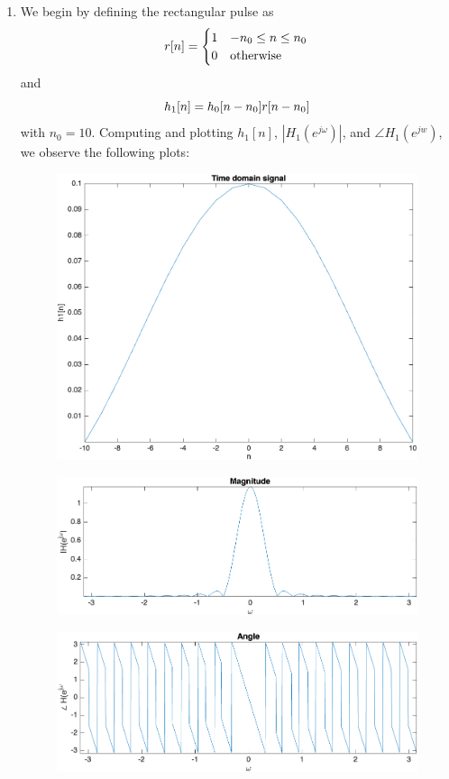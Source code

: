 \documentclass[12pt]{article}
\begin{document}
\begin{enumerate}[label=\textbf{\alph*)}, leftmargin=2.6em]
\item We begin by defining the rectangular pulse as
\begin{equation} \notag
    r[n]=
    \begin{cases}
        1 & -n_0\le n \le n_0\\
        0 & \text{otherwise}
    \end{cases}
\end{equation}
and
\begin{equation} \notag
    h_1[n]=h_0[n-n_0]r[n-n_0]
\end{equation}
with $n_0=10$. Computing and plotting $h_1[n]$, $|H_1(e^{j\omega})|$, and $\angle H_1(e^{jw})$, we observe the following plots:
\begin{figure} [H]
    \centering
    \includegraphics[width=0.75\linewidth]{1.png}
\end{figure}
\begin{figure} [H]
    \centering
    \includegraphics[width=0.75\linewidth]{2.png}
\end{figure}
\begin{figure} [H]
    \centering
    \includegraphics[width=0.75\linewidth]{3.png}

\end{figure}
\end{enumerate}
\end{document}

